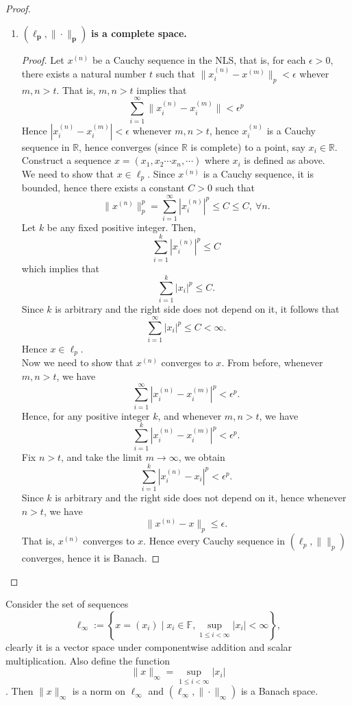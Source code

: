 \begin{eg}
\begin{proof}
\begin{enumerate}
            \item $\bm{(\ell_{p},\|\cdot\|_{p})}$\textbf{ is a complete space.}
                \begin{proof}
                    Let $x^{(n)}$ be a Cauchy sequence in the NLS, that is, for each $\epsilon>0$, there exists a natural number $t$ such that $\|x_{i}^{(n)}-x^{(m)}\|_{p}<\epsilon$ whever $m,n>t$. That is, $m,n>t$ implies that $$\sum_{i=1}^{\infty}\|x_{i}^{(n)}-x_{i}^{(m)}\|<\epsilon^{p}$$ 
                Hence $\left|x_{i}^{(n)}-x_{i}^{(m)}\right|<\epsilon$ whenever $m,n>t$, hence $x_{i}^{(n)}$ is a Cauchy sequence in $\mathbb{R}$, hence converges (since $\mathbb{R}$ is complete) to a point, say $x_{i}\in \mathbb{R}$.\\ 
                Construct a sequence $x=(x_{1},x_{2}\cdots x_{n},\cdots)$ where $x_{i}$ is defined as above.\\
                We need to show that $x\in\ell_{p}$. Since $x^{(n)}$ is a Cauchy sequence, it is bounded, hence there exists a constant $C>0$ such that $$\|x^{(n)}\|_{p}^{p}=\sum_{i=1}^{\infty}\left|x_{i}^{(n)}\right|^{p}\leq C\leq C,~\forall n.$$
                Let $k$ be any fixed positive integer. Then, $$\sum_{i=1}^{k}\left|x_{i}^{(n)}\right|^{p}\leq C$$ which implies that $$\sum_{i=1}^{k}\left|x_{i}\right|^{p}\leq C.$$
                Since $k$ is arbitrary and the right side does not depend on it, it follows that $$\sum_{i=1}^{\infty}\left|x_{i}\right|^{p}\leq C<\infty.$$
                Hence $x\in\ell_{p}$.\\ 
                Now we need to show that $x^{(n)}$ converges to $x$. From before, whenever $m,n>t$, we have $$\sum_{i=1}^{\infty}|x_{i}^{(n)}-x_{i}^{(m)}|^{p}<\epsilon^{p}.$$
                Hence, for any positive integer $k$, and whenever $m,n>t$, we have $$\sum_{i=1}^{k}|x_{i}^{(n)}-x_{i}^{(m)}|^{p}<\epsilon^{p}.$$
                Fix $n>t$, and take the limit $m\to\infty$, we obtain $$\sum_{i=1}^{k}|x_{i}^{(n)}-x_{i}|^{p}<\epsilon^{p}.$$
                Since $k$ is arbitrary and the right side does not depend on it, hence whenever $n>t$, we have $$\|x^{(n)}-x\|_{p}\leq \epsilon.$$
                That is, $x^{(n)}$ converges to $x$.
                Hence every Cauchy sequence in $(\ell_{p},\|\|_{p})$ converges, hence it is Banach.
                \end{proof}
        \end{enumerate}
        \phantom\qedhere
    \end{proof}
\end{eg}
\vspace{0.4cm}
\begin{eg}
    Consider the set of sequences $$\ell_{\infty}:=\left\{x=(x_{i})\mid x_{i}\in \mathbb{F}, \sup_{1\leq i<\infty}|x_{i}|<\infty\right\},$$ clearly it is a vector space under componentwise addition and scalar multiplication. Also define the function $$\|x\|_{\infty}=\sup_{1\leq i<\infty}|x_{i}|$$. Then $\|x\|_{\infty}$ is a norm on $\ell_{\infty}$ and $(\ell_{\infty},\|\cdot\|_{\infty})$ is a Banach space.
\end{eg}
\vspace{0.4cm}


